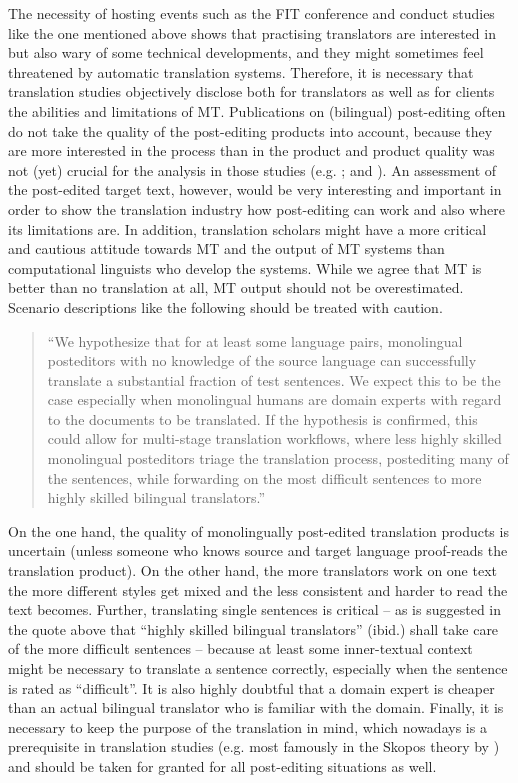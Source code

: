 \documentclass[output=paper]{langsci/langscibook}
\begin{document}
The necessity of hosting events such as the FIT conference and conduct studies like the one mentioned above shows that practising translators are interested in but also wary of some technical developments, and they might sometimes feel threatened by automatic translation systems. Therefore, it is necessary that translation studies objectively disclose both for translators as well as for clients the abilities and limitations of MT. Publications on (bilingual) post-editing often do not take the quality of the post-editing products into account, because they are more interested in the process than in the product and product quality was not (yet) crucial for the analysis in those studies (e.g. \citealt{almeida2010}; \citealt{Winther2014} and \citealt{bangalore2015}). An assessment of the post-edited target text, however, would be very interesting and important in order to show the translation industry how post-editing can work and also where its limitations are. In addition, translation scholars might have a more critical and cautious attitude towards MT and the output of MT systems than computational linguists who develop the systems. While we agree that MT is better than no translation at all, MT output should not be overestimated. Scenario descriptions like the following should be treated with caution.


\begin{quotation}
``We hypothesize that for at least some language pairs, monolingual posteditors with no knowledge of the source language can successfully translate a substantial fraction of test sentences. We expect this to be the case especially when monolingual humans are domain experts with regard to the documents to be translated. If the hypothesis is confirmed, this could allow for multi-stage translation workflows, where less highly skilled monolingual posteditors triage the translation process, postediting many of the sentences, while forwarding on the most difficult sentences to more highly skilled bilingual translators.'' \citep[191]{schwartz2014}\end{quotation}

On the one hand, the quality of monolingually post-edited translation products is uncertain (unless someone who knows source and target language proof-reads the translation product). On the other hand, the more translators work on one text the more different styles get mixed and the less consistent and harder to read the text becomes. Further, translating single sentences is critical -- as is suggested in the quote above that ``highly skilled bilingual translators'' (ibid.) shall take care of the more difficult sentences -- because at least some inner-textual context might be necessary to translate a sentence correctly, especially when the sentence is rated as ``difficult''. It is also highly doubtful that a domain expert is cheaper than an actual bilingual translator who is familiar with the domain. Finally, it is necessary to keep the purpose of the translation in mind, which nowadays is a prerequisite in translation studies (e.g. most famously in the Skopos theory by \citealt{Vermeer1984}) and should be taken for granted for all post-editing situations as well.
\end{document}
